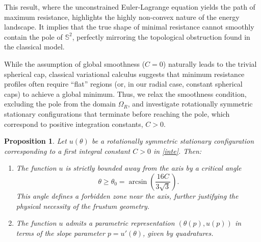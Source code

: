 \documentclass[a4paper,12pt]{amsart}
\theoremstyle{plain}
\newtheorem{proposition}[theorem]{Proposition}
\theoremstyle{definition}
\begin{document}
This result, where the unconstrained Euler-Lagrange equation yields the path of maximum resistance, highlights the highly non-convex nature of the energy landscape. It implies that the true shape of minimal resistance cannot smoothly contain the pole of $\mathbb{S}^2$, perfectly mirroring the topological obstruction found in the classical model.


While the assumption of global smoothness ($C=0$) naturally leads to the trivial spherical cap, classical variational calculus suggests that minimum resistance profiles often require ``flat'' regions (or, in our radial case, constant spherical caps) to achieve a global minimum. Thus, we relax the smoothness condition, excluding the pole from the domain $\Omega_R$, and investigate rotationally symmetric stationary configurations that terminate before reaching the pole, which correspond to positive integration constants, $C > 0$.

\begin{proposition} 
Let $u(\theta)$ be a rotationally symmetric stationary configuration corresponding to a first integral constant $C > 0$ in \eqref{inte}. Then:
\begin{enumerate}
 \item The function $u$ is strictly bounded away from the axis by a critical angle 
 $$\theta \ge \theta_0= \arcsin\left(\frac{16C}{3\sqrt{3}}\right).$$
 This angle defines a forbidden zone near the axis, further justifying the physical necessity of the frustum geometry.
 \item The function $u$ admits a parametric representation $(\theta(p), u(p))$ in terms of the slope parameter $p = u'(\theta)$, given by quadratures.
\end{enumerate}
\end{proposition}
\end{document}
